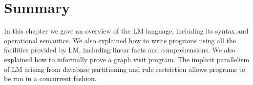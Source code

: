 \section{Summary}

In this chapter we gave an overview of the LM language, including its syntax and
operational semantics.  We also explained how to write programs using all the
facilities provided by LM, including linear facts and comprehensions. We also
explained how to informally prove a graph visit program.
The implicit parallelism of LM arising from database partitioning and rule
restriction allows programs to be run in a concurrent fashion.
